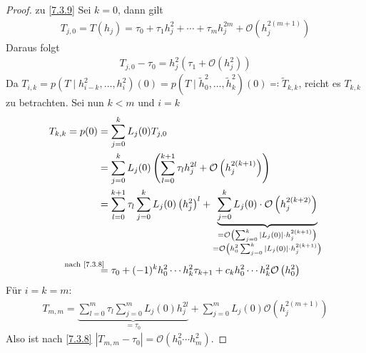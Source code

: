\begin{proof}
  zu \ref{7.3.9}
  Sei $k=0$, dann gilt
  \begin{gather*}
    T_{j,0} = T(h_j) = \tau_0+\tau_1h_j^2+\dotsb+\tau_mh_j^{2m} 
    +\mathcal{O}\left(h_j^{2(m+1)}\right)
  \end{gather*}
  Daraus folgt
  \begin{gather*}
    T_{j,0}-\tau_0=h_j^2\left(\tau_1+\mathcal{O}( h_j^2)\right)
  \end{gather*}
  Da $T_{i,k}=p(T\mid h_{i-k}^2,\dotsc,h_i^2)(0)
  =p(T\mid \widetilde{h}_0^2,\dotsc,\widetilde{h}_k^2)(0)
  \eqqcolon \widetilde{T}_{k,k}$, reicht es $T_{k,k}$ zu betrachten.
  Sei nun $k<m$ und $i=k$
  \begin{align*}
    T_{k,k} = p(0) &= \sum_{j=0}^kL_j(0)T_{j,0} \\
                   &= \sum_{j=0}^kL_j(0)\left(
                     \sum_{l=0}^{k+1}\tau_lh_j^{2l}+\mathcal{O}\left(
                     h_j^{2(k+1)}\right)\right)\\
                   &= \sum_{l=0}^{k+1}\tau_l\sum_{j=0}^kL_j(0)\left(h_j^2\right)^l
                     + \underbrace{\sum_{j=0}^kL_j(0)
                     \cdot \mathcal{O}\left(h_j^{2(k+2)}\right)
                     }_{\substack{
                     =\mathcal{O}\left(
                     \sum_{j=0}^k|L_j(0)|\cdot h_j^{2(k+1)}\right) \\
    =\mathcal{O}\left(h_0^2\sum_{j=0}^k|L_j(0)|\cdot h_j^{2(k+1)}\right)
    }}\\
                   &\overset{\mathllap{\text{nach \ref{7.3.8}}}}{=}
                     \tau_0 + (-1)^kh_0^2\dotsm
                     h_k^2\tau_{k+1}
                     +c_kh_0^2\dotsm h_k^2\mathcal{O}\left(h_0^2\right)
  \end{align*}
  Für $i=k=m$:
  \begin{gather*}
    T_{m,m}=\underbrace{
      \sum_{l=0}^m\tau_l\sum_{j=0}^m
      L_j(0)h_j^{2l}
    }_{=\tau_0}
    +\sum_{j=0}^m L_j(0)\mathcal{O}\left(h_j^{2(m+1)}\right)
  \end{gather*}
  Also ist nach \ref{7.3.8}
  $\left| T_{m,m}-\tau_0\right| 
  = \mathcal{O}\left(h_0^2\dotsm h_m^2\right)$.
\end{proof}


